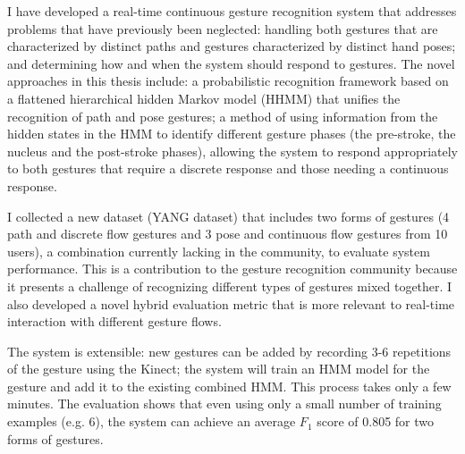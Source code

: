 I have developed a real-time continuous gesture recognition system that
addresses problems that have previously been neglected: handling both gestures that are
characterized by distinct paths and gestures characterized by distinct hand
poses; and determining how and when the system should respond to gestures.
The novel approaches in this thesis include: a probabilistic recognition
framework based on a flattened hierarchical hidden Markov model (HHMM) that
unifies the recognition of path and pose gestures;
a method of using information from the
hidden states in the HMM to identify different
gesture phases (the pre-stroke, the nucleus and the post-stroke
phases), allowing the system to respond appropriately to both gestures that
require a discrete response and those needing a continuous response.

I collected a new dataset (YANG dataset) that includes two forms of
gestures (4 path and discrete flow gestures and 3 pose and continuous flow
gestures from 10 users), a combination currently lacking in the community, to
evaluate system performance. This is a contribution to the gesture recognition
community because it presents a challenge of recognizing different
types of gestures mixed together. I also developed a novel hybrid evaluation
metric that is more relevant to real-time interaction with different gesture flows.

The system is extensible: new gestures can be added by recording 3-6 repetitions
of the gesture using the Kinect; the system will train an HMM model for the gesture
and add it to the existing combined HMM. This process takes only a few minutes.
The evaluation shows that even using only a small number of
training examples (e.g. 6), the system can achieve an average $F_1$ score of 0.805 for
two forms of gestures.
